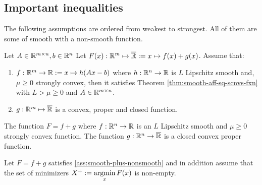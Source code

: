 \documentclass[12pt]{article}
\begin{document}
    \subsection{Important inequalities}
            The following assumptions are ordered from weakest to strongest. 
            All of them are some of smooth with a non-smooth function. 
            \begin{assumption}\label{ass:snorm-smth-p-nsmth}
                Let $A \in \mathbb R^{m\times n}, b \in \mathbb R^n$
                Let $F(x): \mathbb R^{m} \mapsto \overline{\mathbb R} := x \mapsto f(x) + g(x)$. 
                Assume that: 
                \begin{enumerate}[noitemsep]
                    \item $f:\mathbb R^m \rightarrow \mathbb R := x \mapsto h(Ax - b)$ where $h:\mathbb R^n\rightarrow \mathbb R$ is $L$ Lipschitz smooth and, $\mu\ge 0$ strongly convex, then it satisfies Theorem \ref{thm:smooth-aff-sq-scnvs-fxn} with $L > \mu \ge 0$ and $A \in \mathbb R^{m \times n}$. 
                    \item $g:\mathbb R^m \mapsto \overline {\mathbb R}$ is a convex, proper and closed function. 
                \end{enumerate}
            \end{assumption}
            \begin{assumption}\label{ass:smooth-plus-nonsmooth}
                The function $F = f + g$ where $f:\mathbb R^n \rightarrow \mathbb R$ is an $L$ Lipschitz smooth and $\mu \ge 0$ strongly convex function. 
                The function $g:\mathbb R^n \rightarrow \overline {\mathbb R}$ is a closed convex proper function. 
            \end{assumption}
            \begin{assumption}\label{ass:smooth-plus-nonsmooth-x}
                Let $F = f + g$ satisfies \ref{ass:smooth-plus-nonsmooth} and in addition assume that the set of minimizers $X^+ := \mathop{\rm argmin}\limits_{x}F(x)$ is non-empty. 
            \end{assumption}
\end{document}
